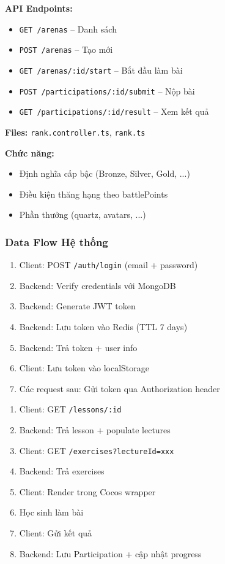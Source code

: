 \textbf{API Endpoints:}
\begin{itemize}
\item \texttt{GET /arenas} -- Danh sách
\item \texttt{POST /arenas} -- Tạo mới
\item \texttt{GET /arenas/:id/start} -- Bắt đầu làm bài
\item \texttt{POST /participations/:id/submit} -- Nộp bài
\item \texttt{GET /participations/:id/result} -- Xem kết quả
\end{itemize}


\textbf{Files:} \texttt{rank.controller.ts}, \texttt{rank.ts}

\textbf{Chức năng:}
\begin{itemize}
\item Định nghĩa cấp bậc (Bronze, Silver, Gold, ...)
\item Điều kiện thăng hạng theo battlePoints
\item Phần thưởng (quartz, avatars, ...)
\end{itemize}

\subsubsection{Data Flow Hệ thống}


\begin{enumerate}
\item Client: POST \texttt{/auth/login} (email + password)
\item Backend: Verify credentials với MongoDB
\item Backend: Generate JWT token
\item Backend: Lưu token vào Redis (TTL 7 days)
\item Backend: Trả token + user info
\item Client: Lưu token vào localStorage
\item Các request sau: Gửi token qua Authorization header
\end{enumerate}


\begin{enumerate}
\item Client: GET \texttt{/lessons/:id}
\item Backend: Trả lesson + populate lectures
\item Client: GET \texttt{/exercises?lectureId=xxx}
\item Backend: Trả exercises
\item Client: Render trong Cocos wrapper
\item Học sinh làm bài
\item Client: Gửi kết quả
\item Backend: Lưu Participation + cập nhật progress
\end{enumerate}

